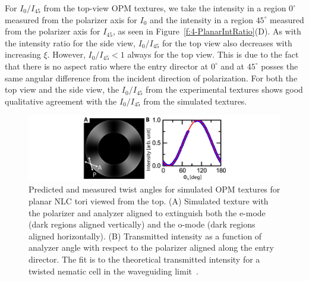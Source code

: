 For $I_0/I_{45}$ from the top-view OPM textures, we take the intensity in a region  $0^{\circ}$ measured from the polarizer axis for $I_0$ and the intensity in a region $45^{\circ}$ measured from the polarizer axis for $I_{45}$, as seen in Figure~\ref{f:4-PlanarIntRatio}(D).
As with the intensity ratio for the side view, $I_0/I_{45}$ for the top view also decreases with increasing $\xi$. However, $I_0/I_{45}<1$ always for the top view.
This is due to the fact that there is no aspect ratio where the entry director at $0^{\circ}$ and at $45^{\circ}$ posses the same angular difference from the incident direction of polarization.
For both the top view and the side view, the $I_0/I_{45}$ from the experimental textures shows good qualitative agreement with the $I_0/I_{45}$ from the simulated textures.
\begin{figure}
\centering
\includegraphics{figures/C4/Ch4-Figs_MeasuredTwist.png}
\caption{Predicted and measured twist angles for simulated OPM textures for planar NLC tori viewed from the top.
(A) Simulated texture with the polarizer and analyzer aligned to extinguish both the e-mode (dark regions aligned vertically) and the o-mode (dark regions aligned horizontally).
(B) Transmitted intensity as a function of analyzer angle with respect to the polarizer aligned along the entry director.
The fit is to the theoretical transmitted intensity for a twisted nematic cell in the waveguiding limit~\cite{RN232}.}\label{f:4-PlanarTwist}
\end{figure}

